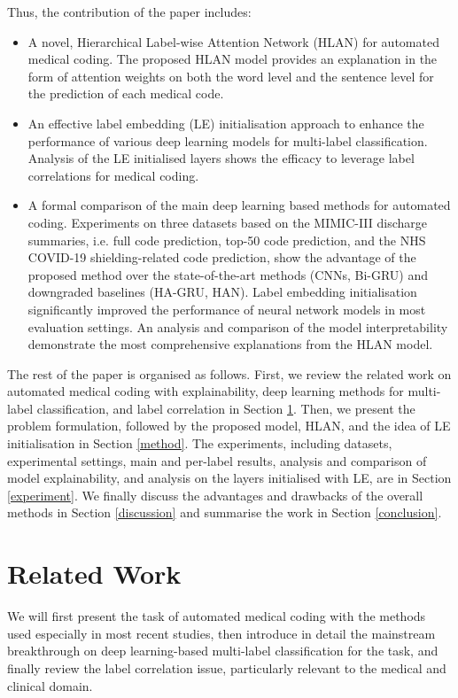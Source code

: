 \documentclass[final,5p,times,twocolumn]{elsarticle}
\begin{document}
Thus, the contribution of the paper includes:
\begin{itemize}
    \item A novel, Hierarchical Label-wise Attention Network (HLAN) for automated medical coding. The proposed HLAN model provides an explanation in the form of attention weights on both the word level and the sentence level for the prediction of each medical code.
    \item An effective label embedding (LE) initialisation approach to enhance the performance of various deep learning models for multi-label classification. Analysis of the LE initialised layers shows the efficacy to leverage label correlations for medical coding.
    \item A formal comparison of the main deep learning based methods for automated coding. Experiments on three datasets based on the MIMIC-III discharge summaries, i.e. full code prediction, top-50 code prediction, and the NHS COVID-19 shielding-related code prediction, show the advantage of the proposed method over the state-of-the-art methods (CNNs, Bi-GRU) and downgraded baselines (HA-GRU, HAN). Label embedding initialisation significantly improved the performance of neural network models in most evaluation settings. An analysis and comparison of the model interpretability demonstrate the most comprehensive explanations from the HLAN model.
\end{itemize}

The rest of the paper is organised as follows. First, we review the related work on automated medical coding with explainability, deep learning methods for multi-label classification, and label correlation in Section \ref{rw}. Then, we present the problem formulation, followed by the proposed model, HLAN, and the idea of LE initialisation in Section \ref{method}. The experiments, including datasets, experimental settings, main and per-label results, analysis and comparison of model explainability, and analysis on the layers initialised with LE, are in Section \ref{experiment}. We finally discuss the advantages and drawbacks of the overall methods in Section \ref{discussion} and summarise the work in Section \ref{conclusion}.

\section{Related Work}
\label{rw}
We will first present the task of automated medical coding with the methods used especially in most recent studies, then introduce in detail the mainstream breakthrough on deep learning-based multi-label classification for the task, and finally review the label correlation issue, particularly relevant to the medical and clinical domain.
\end{document}
